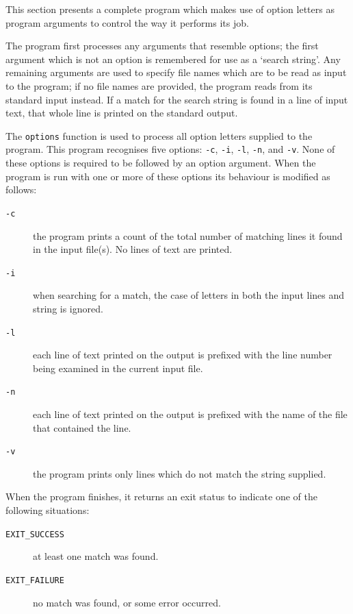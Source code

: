   

  This section presents a complete program which makes use of option letters
   as program arguments to control the way it performs its job.


  The program first processes any arguments that resemble options; the first
   argument which is not an option is remembered for use as a `search
   string'. Any remaining arguments are used to specify file names which are
   to be read as input to the program; if no file names are provided, the
   program reads from its standard input instead. If a match for the search
   string is found in a line of input text, that whole line is printed on the
   standard output.


  The \texttt{options} function is used to process all option letters
   supplied to the program. This program recognises five options:
   \texttt{-c}, \texttt{-i}, \texttt{-l}, \texttt{-n}, and
   \texttt{-v}. None of these options is required to be followed by an
   option argument. When the program is run with one or more of these options
   its behaviour is modified as follows:


  \begin{description}
   \item[\texttt{-c}] the program prints a count of the total number of matching lines it
    found in the input file(s). No lines of text are printed.

   \item[\texttt{-i}] when searching for a match, the case of letters in both the input lines
    and string is ignored.

   \item[\texttt{-l}] each line of text printed on the output is prefixed with the line number
    being examined in the current input file.

   \item[\texttt{-n}] each line of text printed on the output is prefixed with the name of the
    file that contained the line.

   \item[\texttt{-v}] the program prints only lines which do not match the string
    supplied.
  \end{description}

  When the program finishes, it returns an exit status to indicate one of
   the following situations:


  \begin{description}
   \item[\texttt{EXIT\_SUCCESS}] at least one match was found.
   \item[\texttt{EXIT\_FAILURE}] no match was found, or some error occurred.
  \end{description}

